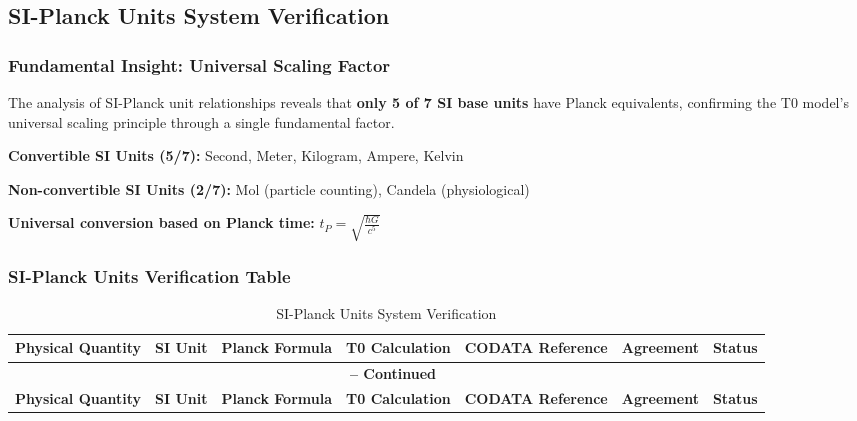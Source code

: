 \documentclass[12pt,a4paper]{article}
\begin{document}
\begin{landscape}
	
	\subsection{SI-Planck Units System Verification}
	\label{subsec:si_planck_verification}
	
	\subsubsection{Fundamental Insight: Universal Scaling Factor}
	\label{subsubsec:universal_scaling}
	
	The analysis of SI-Planck unit relationships reveals that \textbf{only 5 of 7 SI base units} have Planck equivalents, confirming the T0 model's universal scaling principle through a single fundamental factor.
	
	\begin{tcolorbox}[colback=blue!5!white,colframe=blue!75!black,title=SI-Planck Unit Limitation]
		\textbf{Convertible SI Units (5/7):} Second, Meter, Kilogram, Ampere, Kelvin
		
		\textbf{Non-convertible SI Units (2/7):} Mol (particle counting), Candela (physiological)
		
		\textbf{Universal conversion based on Planck time:} $t_P = \sqrt{\frac{\hbar G}{c^5}}$
	\end{tcolorbox}
	
	\subsubsection{SI-Planck Units Verification Table}
	\label{subsubsec:si_planck_table}
	\footnotesize
	\begin{longtable}{p{4.5cm}p{2cm}p{4cm}p{3.5cm}p{3.5cm}p{2cm}p{1cm}}
		\caption{SI-Planck Units System Verification} \\
		\toprule
		\textbf{Physical Quantity} & \textbf{SI Unit} & \textbf{Planck Formula} & \textbf{T0 Calculation} & \textbf{CODATA Reference} & \textbf{Agreement} & \textbf{Status} \\
		\midrule
		\endfirsthead
		
		\multicolumn{7}{c}{{\bfseries \tablename\ \thetable{} -- Continued}} \\
		\toprule
		\textbf{Physical Quantity} & \textbf{SI Unit} & \textbf{Planck Formula} & \textbf{T0 Calculation} & \textbf{CODATA Reference} & \textbf{Agreement} & \textbf{Status} \\
		\midrule
		\endhead
		

\end{longtable}
\end{landscape}
\end{document}
